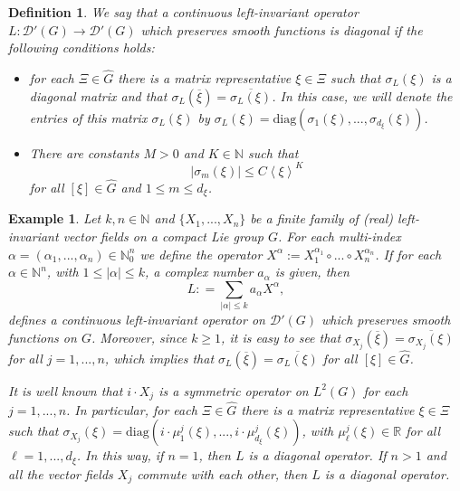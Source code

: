 \documentclass[sn-mathphys-num]{sn-jnl}%
\numberwithin{equation}{section}
\theoremstyle{thmstyleone}
\theoremstyle{thmstyletwo}
\newtheorem{example}{Example}[section]
\theoremstyle{thmstylethree}
\newtheorem{definition}{Definition}[section]
\def\jp#1{{\left\langle{#1}\right\rangle}}
\begin{document}
\begin{definition}\label{diagonal}
	We say that a continuous left-invariant operator $L: \mathcal{D}'(G) \rightarrow \mathcal{D}'(G)$ which preserves smooth functions is diagonal if the following conditions holds:
	\begin{itemize}
		\item[a)] for each $\Xi \in \widehat{G}$ there is a matrix representative $\xi \in \Xi$ such that $\sigma_L(\xi)$ is a diagonal matrix and that $\sigma_L(\overline{\xi})=\overline{\sigma_L(\xi)}$. In this case, we will denote the entries of this matrix $\sigma_L(\xi)$ by 
	$\sigma_L(\xi)=\textrm{diag}(\sigma_1(\xi),...,\sigma_{d_\xi}(\xi))$. 
		\item[b)] There are constants $M>0$ and $K \in \mathbb{N}$ such that
		\begin{equation}\label{condsimbolo}
		|\sigma_m(\xi)| \leq C \jp{\xi}^K
		\end{equation}
		for all $[\xi] \in \widehat{G}$ and $1 \leq m \leq d_\xi$.
	\end{itemize}
\end{definition} 

\begin{example} Let $k,n \in \mathbb{N}$ and $\{X_1,...,X_n\}$ be a finite family of (real) left-invariant vector fields on a compact Lie group $G$. For each multi-index $\alpha=(\alpha_1,...,\alpha_n) \in \mathbb{N}_0^n$ we define the operator $X^\alpha:= X_1^{\alpha_1} \circ ... \circ X_n^{\alpha_n}$. If for each $\alpha \in \mathbb{N}^n$, with $1 \leq |\alpha| \leq k$, a complex number $a_\alpha$ is given, then 
	$$L: = \sum_{|\alpha| \leq k} a_\alpha X^\alpha,$$
defines a continuous left-invariant operator on $\mathcal{D}'(G)$ which preserves smooth functions on $G$. Moreover, since $k \geq 1$, it is easy to see that $\sigma_{X_j}(\overline{\xi}) = \overline{\sigma_{X_j}(\xi)}$ for all $j=1,...,n$, which implies that $\sigma_{L}(\overline{\xi}) = \overline{\sigma_L(\xi)}$ for all $[\xi] \in \widehat{G}$.

	It is well known that $i \cdot X_j$ is a symmetric operator on $L^2(G)$ for each $j=1,...,n$. In particular, for each $\Xi \in \widehat{G}$ there is a matrix representative $\xi \in \Xi$ such that $\sigma_{X_j}(\xi)=\textrm{diag}(i\cdot \mu_1^j(\xi),...,i \cdot \mu_{d_\xi}^j(\xi))$, with $\mu_\ell^j(\xi) \in \mathbb{R}$ for all $\ell=1,...,d_\xi$. In this way, if $n=1$, then $L$ is a diagonal operator. If $n>1$ and all the vector fields $X_j$ commute with each other, then $L$ is a diagonal operator.   
\end{example}
\end{document}
